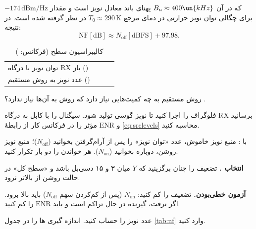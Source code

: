 \documentclass[a4paper,11pt]{article}
\begin{document}
\begin{steps}
که در آن
$B_n \approx 400\un{kHz}$
پهنای باند معادل نویز است و مقدار
$-174\,\mathrm{dBm/Hz}$
برای چگالی توان نویز حرارتی در دمای مرجع
$T_0 \approx 290\,\mathrm{K}$
در نظر گرفته شده است. در نتیجه:
\[
\mathrm{NF}[\mathrm{dB}]
\approx
N_{\mathrm{off}}[\mathrm{dBFS}]+97.98.
\]
\end{steps}

\begin{table}[H]
	\centering\small
	\caption{کالیبراسیون سطح (فرکانس: \blank[1.6cm] )}
	\label{tab:cal}
	\begin{tabularx}{\linewidth}{|X|Y|Y|Y|}
		\hline
		\hdrrow {} &  &  &  \\ \hline
		توان نویز با درگاه RX باز (\dBFS) & \rowstrut & & \\ \hline
		عدد نویز به روش مستقیم () & \rowstrut & & \\ \hline
	\end{tabularx}
\end{table}

\begin{question}
روش مستقیم به چه کمیت‌هایی نیاز دارد که روش
به آن‌ها نیاز ندارد؟ .
\end{question}

\label{part:nf}
\begin{steps}
\item فلوگراف 
را اجرا کنید تا نویز گوسی تولید شود. سیگنال را با کابل
به درگاه 
RX 
برسانید و
$\mathrm{ENR}$
مؤثر را در فرکانس کار از رابطهٔ
\eqref{eq:srclevels}
محاسبه کنید.
\item با
:
منبع نویز خاموش، عدد «توان نویز» را پس از آرام‌گرفتن بخوانید
($N_{\mathrm{off}}$)؛
منبع نویز روشن، دوباره بخوانید
($N_{\mathrm{on}}$).
هر خواندن را دو بار تکرار کنید.
\item \textbf{انتخاب .} تضعیف را چنان برگزینید که
$Y$
میان ۳ و ۱۵ دسی‌بل باشد و «سطح کل» در حالت روشن از
بالاتر نرود.
\item \textbf{آزمون خطی‌بودن.} تضعیف را
کم کنید:
$N_{\mathrm{on}}$
(پس از کم‌کردن سهم
$N_{\mathrm{off}}$)
باید
بالا برود. اگر نرفت، گیرنده در حال تراکم است و باید
$\mathrm{ENR}$
را کم کنید.
\item عدد نویز را حساب کنید. اندازه گیری ها را در جدول 
\ref{tab:nf}
وارد کنید.
\end{steps}
\end{document}
